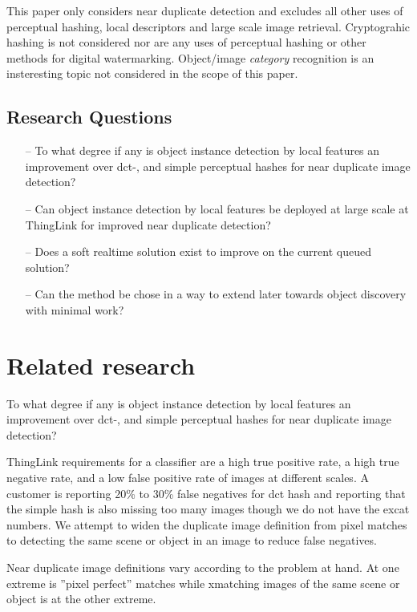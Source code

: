 \documentclass[english,12pt,a4paper,pdftex,elec,utf8]{aaltothesis}
\begin{document}
This paper only considers near duplicate detection and excludes all other uses of perceptual hashing, local descriptors and large scale image retrieval. Cryptograhic hashing is not considered nor are any uses of perceptual hashing or other methods for digital watermarking. Object/image \emph{category} recognition is an insteresting topic not considered in the scope of this paper.

\subsection{Research Questions}
\begin{itemize}
\item[--] To what degree if any is object instance detection by local features an improvement over dct-, and simple perceptual hashes for near duplicate image detection?
\item[--] Can object instance detection by local features be deployed at large scale at ThingLink for improved near duplicate detection?
\item[--] Does a soft realtime solution exist to improve on the current queued solution?
  \item[--] Can the method be chose in a way to extend later towards object discovery with minimal work?
\end{itemize}

\clearpage

\section{Related research}
To what degree if any is object instance detection by local features an improvement over dct-, and simple perceptual hashes for near duplicate image detection?

ThingLink requirements for a classifier are a high true positive rate, a high true negative rate, and a low false positive rate of images at different scales. A customer is reporting 20\% to 30\% false negatives for dct hash and reporting that the simple hash is also missing too many images though we do not have the excat numbers. We attempt to widen the duplicate image definition from pixel matches to detecting the same scene or object in an image to reduce false negatives.

Near duplicate image definitions vary according to the problem at hand. At one extreme is ''pixel perfect'' matches while xmatching images of the same scene or object is at the other extreme.
\end{document}
